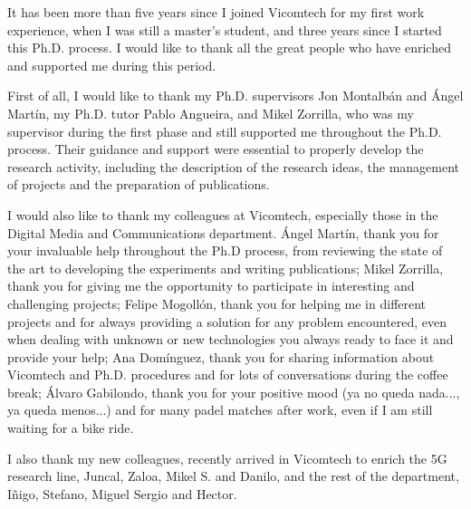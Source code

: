 


\begin{acknowledgements}

It has been more than five years since I joined Vicomtech for my first work experience, when I was still a master's student, and three years since I started this Ph.D. process. I would like to thank all the great people who have enriched and supported me during this period.

First of all, I would like to thank my Ph.D. supervisors Jon Montalb\'an and \'Angel Mart\'in, my Ph.D. tutor Pablo Angueira, and Mikel Zorrilla, who was my supervisor during the first phase and still supported me throughout the Ph.D. process. Their guidance and support were essential to properly develop the research activity, including the description of the research ideas, the management of projects and the preparation of publications.

I would also like to thank my colleagues at Vicomtech, especially those in the Digital Media and Communications department. \'Angel Mart\'in, thank you for your invaluable help throughout the Ph.D process, from reviewing the state of the art to developing the experiments and writing publications; Mikel Zorrilla, thank you for giving me the opportunity to participate in interesting and challenging projects; Felipe Mogoll\'on, thank you for helping me in different projects and for always providing a solution for any problem encountered, even when dealing with unknown or new technologies you always ready to face it and provide your help; Ana Dom\'inguez, thank you for sharing information about Vicomtech and Ph.D. procedures and for lots of conversations during the coffee break; \'Alvaro Gabilondo, thank you for your positive mood (ya no queda nada..., ya queda menos...) and for many padel matches after work, even if I am still waiting for a bike ride.

I also thank my new colleagues, recently arrived in Vicomtech to enrich the 5G research line, Juncal, Zaloa, Mikel S. and Danilo, and the rest of the department, Iñigo, Stefano, Miguel Sergio and Hector.


\end{acknowledgements}
